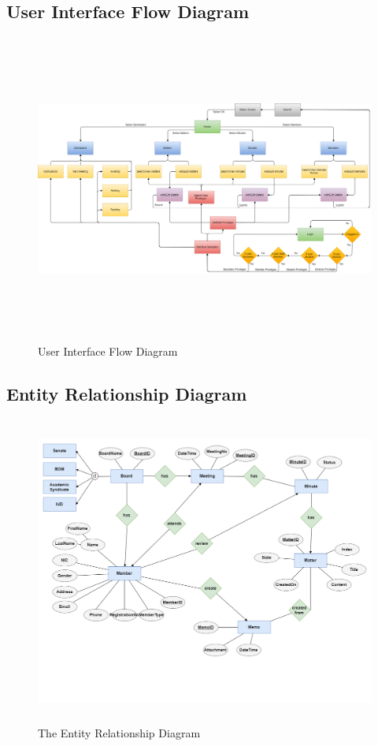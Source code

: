 \documentclass[a4paper,beamer]{article}
\begin{document}
	\subsection{User Interface Flow Diagram}
		\vspace{2cm}
		\begin{figure}[h!]
			\begin{center}
			\includegraphics[width=6in,height=4in]{img/user-interface-flow}
			\end{center}
			\caption{User Interface Flow Diagram}
			\label{fig:user-interface-flow}
		\end{figure}
	\newpage

	\subsection{Entity Relationship Diagram}
		\vspace{2cm}
		\begin{figure}[h]
			\begin{center}
				\includegraphics[width=6in,height=4in]{img/entity-relationship-diagram}
			\end{center}
			\caption{The Entity Relationship Diagram}
			\label{fig:ERD}
		\end{figure}
		\newpage  
	
\end{document}
